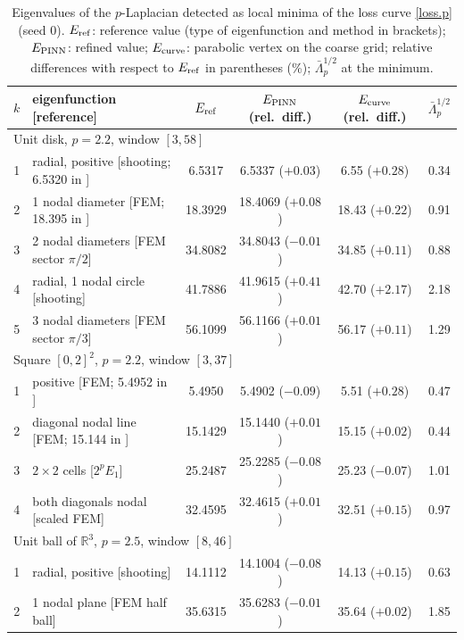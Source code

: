 \documentclass[10pt]{amsart}
\newenvironment{revblock}{\color{blue}}{}
\theoremstyle{definition}
\theoremstyle{remark}
\theoremstyle{plain}
\newcommand{\R}{\mathbb{R}}
\begin{document}
\begin{revblock}
\begin{table}[tbp]
\centering\small
\color{blue}
\caption{Eigenvalues of the $p$-Laplacian detected as local minima of the loss curve \eqref{loss.p} (seed 0). $E_{\rm ref}$: reference value (type of eigenfunction and method in brackets); $E_{\rm PINN}$: refined value; $E_{\rm curve}$: parabolic vertex on the coarse grid; relative differences with respect to $E_{\rm ref}$ in parentheses (\%); $\bar\Lambda_p^{1/2}$ at the minimum.}
\label{tab.plap}
\begin{tabular}{clcccc}
\toprule
$k$ & eigenfunction [reference] & $E_{\rm ref}$ & $E_{\rm PINN}$ (rel.\ diff.) & $E_{\rm curve}$ (rel.\ diff.) & $\bar\Lambda_p^{1/2}$ \\
\midrule
\multicolumn{6}{l}{Unit disk, $p=2.2$, window $[3,58]$}\\
1 & radial, positive [shooting; 6.5320 in \cite{HJ11}] & 6.5317 & 6.5337 ($+0.03$) & 6.55 ($+0.28$) & 0.34 \\
2 & 1 nodal diameter [FEM; 18.395 in \cite{HJ11}] & 18.3929 & 18.4069 ($+0.08$) & 18.43 ($+0.22$) & 0.91 \\
3 & 2 nodal diameters [FEM sector $\pi/2$] & 34.8082 & 34.8043 ($-0.01$) & 34.85 ($+0.11$) & 0.88 \\
4 & radial, 1 nodal circle [shooting] & 41.7886 & 41.9615 ($+0.41$) & 42.70 ($+2.17$) & 2.18 \\
5 & 3 nodal diameters [FEM sector $\pi/3$] & 56.1099 & 56.1166 ($+0.01$) & 56.17 ($+0.11$) & 1.29 \\
\midrule
\multicolumn{6}{l}{Square $[0,2]^2$, $p=2.2$, window $[3,37]$}\\
1 & positive [FEM; 5.4952 in \cite{HJ11}] & 5.4950 & 5.4902 ($-0.09$) & 5.51 ($+0.28$) & 0.47 \\
2 & diagonal nodal line [FEM; 15.144 in \cite{HJ11}] & 15.1429 & 15.1440 ($+0.01$) & 15.15 ($+0.02$) & 0.44 \\
3 & $2\times2$ cells [$2^{p}E_1$] & 25.2487 & 25.2285 ($-0.08$) & 25.23 ($-0.07$) & 1.01 \\
4 & both diagonals nodal [scaled FEM] & 32.4595 & 32.4615 ($+0.01$) & 32.51 ($+0.15$) & 0.97 \\
\midrule
\multicolumn{6}{l}{Unit ball of $\R^3$, $p=2.5$, window $[8,46]$}\\
1 & radial, positive [shooting] & 14.1112 & 14.1004 ($-0.08$) & 14.13 ($+0.15$) & 0.63 \\
2 & 1 nodal plane [FEM half ball] & 35.6315 & 35.6283 ($-0.01$) & 35.64 ($+0.02$) & 1.85 \\
\bottomrule
\end{tabular}
\end{table}


\end{revblock}
\end{document}
